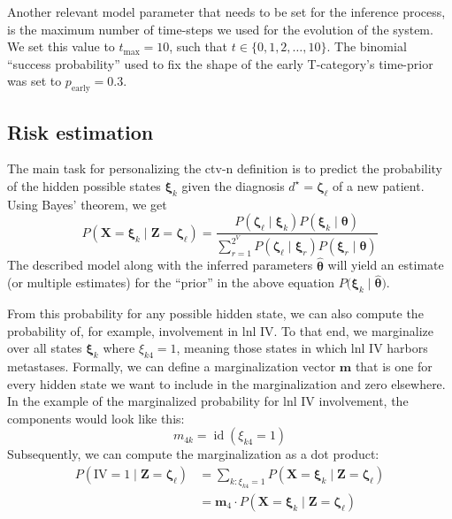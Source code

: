 \documentclass[twocolumn]{aastex631}
\newcommand{\ju}[1]{{\textcolor{red}{#1}}}
\begin{document}
Another relevant model parameter that needs to be set for the inference process, is the maximum number of time-steps we used for the evolution of the system. We set this value to $t_\text{max} = 10$, such that $t \in \{ 0, 1, 2, \ldots, 10 \}$. The binomial ``success probability'' used to fix the shape of the early T-category's time-prior was set to $p_\text{early} = 0.3$.


\subsection{Risk estimation}
\label{subsec:formalism:risk}

The main task for personalizing the \gls{ctv-n} definition is to predict the probability of the hidden possible states $\boldsymbol{\xi}_k$ given the diagnosis $d^\star=\boldsymbol{\zeta}_\ell$ of a new patient. Using Bayes' theorem, we get
%
\begin{equation}
    P\left( \mathbf{X}=\boldsymbol{\xi}_k \mid \mathbf{Z}=\boldsymbol{\zeta}_\ell \right) = \frac{P\left( \boldsymbol{\zeta}_\ell \mid \boldsymbol{\xi}_k \right) P\left( \boldsymbol{\xi}_k \mid \boldsymbol{\theta} \right)}{\sum_{r=1}^{2^V} P\left( \boldsymbol{\zeta}_\ell \mid \boldsymbol{\xi}_r \right) P\left( \boldsymbol{\xi}_r \mid \boldsymbol{\theta} \right) }
\end{equation}
%
The described model along with the inferred parameters $\boldsymbol{\hat{\theta}}$ will yield an estimate (or multiple estimates) for the ``prior'' in the above equation $P\big( \boldsymbol{\xi}_k \mid \boldsymbol{\hat{\theta}} \big)$.

From this probability for any possible hidden state, we can also compute the probability of, for example, involvement in \gls{lnl} IV. To that end, we marginalize over all states $\boldsymbol{\xi}_k$ where $\xi_{k4} = 1$, meaning those states in which \gls{lnl} IV harbors metastases. Formally, we can define a marginalization vector $\mathbf{m}$ that is one for every hidden state we want to include in the marginalization and zero elsewhere. In the example of the marginalized probability for \gls{lnl} IV involvement, the components would look like this:
%
\begin{equation}
    m_{4k} = \operatorname{id}(\xi_{k4} = 1)
\end{equation}
%
Subsequently, we can compute the marginalization as a dot product:
%
\begin{equation}
    \begin{aligned}
        P\left(\text{IV} = 1 \mid \mathbf{Z}=\boldsymbol{\zeta}_\ell \right) &= \sum_{k:\xi_{k4} = 1} P\left( \mathbf{X}=\boldsymbol{\xi}_k \mid \mathbf{Z}=\boldsymbol{\zeta}_\ell \right) \\
        &= \mathbf{m}_4 \cdot P\left( \mathbf{X}=\boldsymbol{\xi}_k \mid \mathbf{Z}=\boldsymbol{\zeta}_\ell \right)
    \end{aligned}
\end{equation}
%
\end{document}
